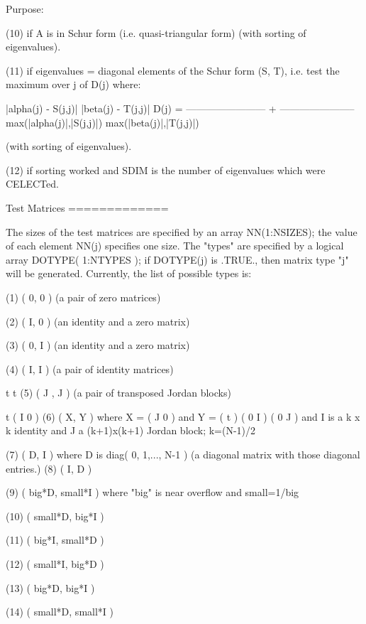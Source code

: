 \begin{DoxyParagraph}{Purpose\+: }
\begin{DoxyVerb}
 (10)  if A is in Schur form (i.e. quasi-triangular form)
       (with sorting of eigenvalues).

 (11)  if eigenvalues = diagonal elements of the Schur form (S, T),
       i.e. test the maximum over j of D(j)  where:

                     |alpha(j) - S(j,j)|        |beta(j) - T(j,j)|
           D(j) = ------------------------ + -----------------------
                  max(|alpha(j)|,|S(j,j)|)   max(|beta(j)|,|T(j,j)|)

       (with sorting of eigenvalues).

 (12)  if sorting worked and SDIM is the number of eigenvalues
       which were CELECTed.

 Test Matrices
 =============

 The sizes of the test matrices are specified by an array
 NN(1:NSIZES); the value of each element NN(j) specifies one size.
 The "types" are specified by a logical array DOTYPE( 1:NTYPES ); if
 DOTYPE(j) is .TRUE., then matrix type "j" will be generated.
 Currently, the list of possible types is:

 (1)  ( 0, 0 )         (a pair of zero matrices)

 (2)  ( I, 0 )         (an identity and a zero matrix)

 (3)  ( 0, I )         (an identity and a zero matrix)

 (4)  ( I, I )         (a pair of identity matrices)

         t   t
 (5)  ( J , J  )       (a pair of transposed Jordan blocks)

                                     t                ( I   0  )
 (6)  ( X, Y )         where  X = ( J   0  )  and Y = (      t )
                                  ( 0   I  )          ( 0   J  )
                       and I is a k x k identity and J a (k+1)x(k+1)
                       Jordan block; k=(N-1)/2

 (7)  ( D, I )         where D is diag( 0, 1,..., N-1 ) (a diagonal
                       matrix with those diagonal entries.)
 (8)  ( I, D )

 (9)  ( big*D, small*I ) where "big" is near overflow and small=1/big

 (10) ( small*D, big*I )

 (11) ( big*I, small*D )

 (12) ( small*I, big*D )

 (13) ( big*D, big*I )

 (14) ( small*D, small*I )


\end{DoxyVerb}
\end{DoxyParagraph}
